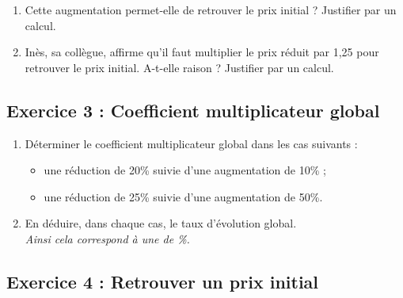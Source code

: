 \documentclass[12pt,a4paper]{article}
\begin{document}
\begin{enumerate}
    \item Cette augmentation permet-elle de retrouver le prix initial ? Justifier par un calcul.\\
    \begin{tcolorbox}[colframe=black, colback=white, width=\linewidth, height=4cm]
    \end{tcolorbox}

    \item Inès, sa collègue, affirme qu’il faut multiplier le prix réduit par 1{,}25 pour retrouver le prix initial. A-t-elle raison ? Justifier par un calcul.\\
    \begin{tcolorbox}[colframe=black, colback=white, width=\linewidth, height=4cm]
    \end{tcolorbox}
\end{enumerate}

\subsection*{Exercice 3 : Coefficient multiplicateur global}

\begin{enumerate}
    \item Déterminer le coefficient multiplicateur global dans les cas suivants :\\
    \begin{itemize}
        \item une réduction de 20\% suivie d’une augmentation de 10\% ;
        \item une réduction de 25\% suivie d’une augmentation de 50\%.
    \end{itemize}
    \begin{tcolorbox}[colframe=black, colback=white, width=\linewidth, height=5cm]
    \end{tcolorbox}

    \item En déduire, dans chaque cas, le taux d’évolution global.\\
    \textit{Ainsi cela correspond à une \dotfill de \dotfill \%.}\\
    \begin{tcolorbox}[colframe=black, colback=white, width=\linewidth, height=3cm]
    \end{tcolorbox}
\end{enumerate}

\subsection*{Exercice 4 : Retrouver un prix initial}
\end{document}
